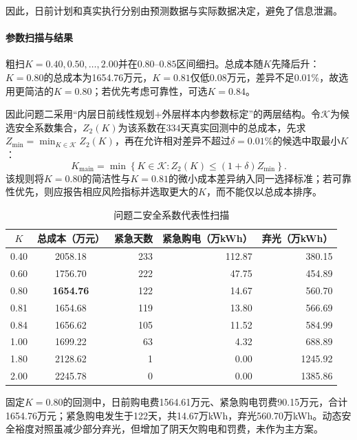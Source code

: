 \documentclass{cumcmthesis}
\begin{document}
因此，日前计划和真实执行分别由预测数据与实际数据决定，避免了信息泄漏。

\paragraph{参数扫描与结果}

粗扫$K=0.40,0.50,\ldots,2.00$并在$0.80$--$0.85$区间细扫。总成本随$K$先降后升：$K=0.80$的总成本为1654.76万元，$K=0.81$仅低0.08万元，差异不足0.01\%，故选用更简洁的$K=0.80$；若优先考虑可靠性，可选$K=0.84$。

因此问题二采用“内层日前线性规划+外层样本内参数标定”的两层结构。令$\mathcal K$为候选安全系数集合，$Z_2(K)$为该系数在334天真实回测中的总成本，先求$Z_{\min}=\min_{K\in\mathcal K}Z_2(K)$，再在允许相对差异不超过$\delta=0.01\%$的候选中取最小$K$：
\begin{equation}
K_{\mathrm{main}}=\min\left\{K\in\mathcal K:Z_2(K)\leq(1+\delta)Z_{\min}\right\}.
\tag{15a}
\end{equation}
该规则将$K=0.80$的简洁性与$K=0.81$的微小成本差异纳入同一选择标准；若可靠性优先，则应报告相应风险指标并选取更大的$K$，而不能仅以总成本排序。

\begin{table}[H]
\centering
\normalsize
\setlength{\tabcolsep}{8pt}
\renewcommand\arraystretch{1.3}
\caption{问题二安全系数代表性扫描}
\label{tab:q2scan}
\begin{tabular}{ccrrr}
\toprule
$K$ & 总成本（万元） & 紧急天数 & 紧急购电（万kWh） & 弃光（万kWh）\\
\midrule
0.40 & 2058.18 & 233 & 112.87 & 380.15\\
0.60 & 1756.70 & 222 & 47.75 & 454.89\\
0.80 & \textbf{1654.76} & 122 & 14.67 & 560.70\\
0.81 & 1654.68 & 119 & 13.80 & 566.69\\
0.84 & 1656.62 & 105 & 11.52 & 584.99\\
1.00 & 1699.22 & 63 & 4.32 & 688.89\\
1.80 & 2128.62 & 1 & 0.00 & 1245.92\\
2.00 & 2245.78 & 0 & 0.00 & 1385.86\\
\bottomrule
\end{tabular}
\end{table}

固定$K=0.80$的回测中，日前购电费1564.61万元、紧急购电罚费90.15万元，合计1654.76万元；紧急购电发生于122天，共14.67万kWh，弃光560.70万kWh。动态安全裕度对照虽减少部分弃光，但增加了阴天欠购电和罚费，未作为主方案。
\end{document}
